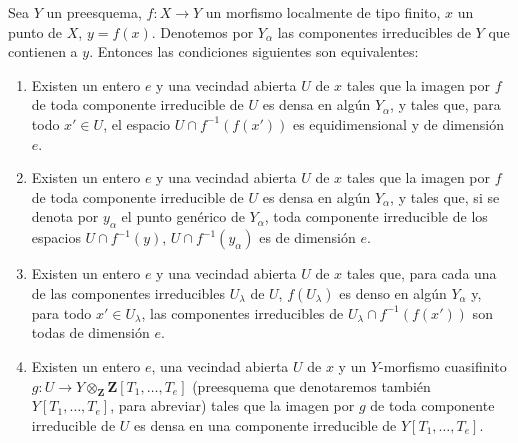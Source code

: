 \begin{proposition}[13.3.1]
\label{IV.13.3.1}
Sea $Y$ un preesquema, $f:X\to Y$ un morfismo localmente de tipo finito, $x$ un punto de $X$, $y=f(x)$.
Denotemos por $Y_\alpha$ las componentes irreducibles de $Y$ que contienen a $y$.
Entonces las condiciones siguientes son equivalentes:
\begin{enumerate}[label=\emph{\alph*)}]
  \item Existen un entero $e$ y una vecindad abierta $U$ de $x$ tales que la imagen por $f$ de toda componente irreducible de $U$ es densa en algún $Y_\alpha$, y tales que, para todo $x'\in U$, el espacio $U\cap f^{-1}(f(x'))$ es equidimensional y de dimensión $e$.
  \item[\emph{a$'$)}] Existen un entero $e$ y una vecindad abierta $U$ de $x$ tales que la imagen por $f$ de toda componente irreducible de $U$ es densa en algún $Y_\alpha$, y tales que, si se denota por $y_\alpha$ el punto genérico de $Y_\alpha$, toda componente irreducible de los espacios $U\cap f^{-1}(y)$, $U\cap f^{-1}(y_\alpha)$ es de dimensión $e$.
  \item[\emph{a$''$)}] Existen un entero $e$ y una vecindad abierta $U$ de $x$ tales que, para cada una de las componentes irreducibles $U_\lambda$ de $U$, $f(U_\lambda)$ es denso en algún $Y_\alpha$ y, para todo $x'\in U_\lambda$, las componentes irreducibles de $U_\lambda\cap f^{-1}(f(x'))$ son todas de dimensión $e$.
  \item Existen un entero $e$, una vecindad abierta $U$ de $x$ y un $Y$-morfismo \textup{cuasifinito} $g:U\longrightarrow Y\otimes_{\mathbf Z}\mathbf Z[T_1,\ldots,T_e]$ \textup{(preesquema que denotaremos también $Y[T_1,\ldots,T_e]$, para abreviar)} tales que la imagen por $g$ de toda componente irreducible de $U$ es densa en una componente irreducible de $Y[T_1,\ldots,T_e]$.
\end{enumerate}
\end{proposition}

